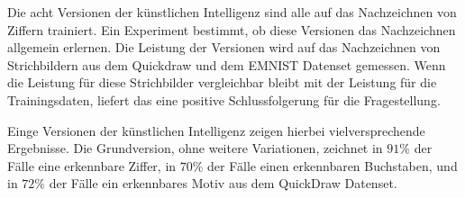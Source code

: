 Die acht Versionen der künstlichen Intelligenz sind alle auf das Nachzeichnen
von Ziffern trainiert. Ein Experiment bestimmt, ob diese Versionen das
Nachzeichnen allgemein erlernen. Die Leistung der Versionen wird auf das
Nachzeichnen von Strichbildern aus dem Quickdraw und dem EMNIST Datenset
gemessen. Wenn die Leistung für diese Strichbilder vergleichbar bleibt mit der
Leistung für die Trainingsdaten, liefert das eine positive Schlussfolgerung für
die Fragestellung.

Einge Versionen der künstlichen Intelligenz zeigen hierbei vielversprechende
Ergebnisse. Die Grundversion, ohne weitere Variationen, zeichnet in $91\%$ der
Fälle eine erkennbare Ziffer, in $70\%$ der Fälle einen erkennbaren Buchstaben,
und in $72\%$ der Fälle ein erkennbares Motiv aus dem QuickDraw Datenset. 


